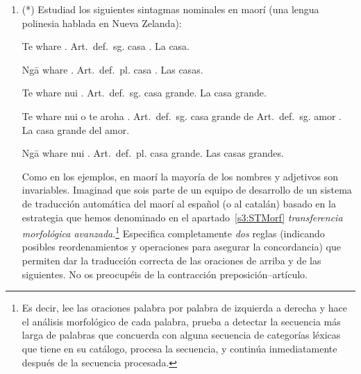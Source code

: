 \begin{enumerate}
\item (*) Estudiad los siguientes sintagmas nominales en maorí (una lengua polinesia hablada en Nueva Zelanda): 

     \begin{example} 
     \gll Te whare .
          \textsf{Art.\ def.\ sg.} casa . 
     \glt La casa. 
     \glend
     \end{example} 

     \begin{example} 
     \gll Ng\={a} whare . 
          \textsf{Art.\ def.\ pl.} casa . 
     \glt Las casas. 
     \glend
     \end{example} 

     \begin{example} 
     \gll Te whare nui . 
          \textsf{Art.\ def.\ sg.} casa grande. 
     \glt La casa grande. 
     \glend
     \end{example} 

     \begin{example} 
     \gll Te whare nui o te aroha . 
          \textsf{Art.\ def.\ sg.} casa grande de \textsf{Art.\ def.\ 
          sg.} amor . 
     \glt La casa grande del amor. 
     \glend
     \end{example} 

     \begin{example} 
     \gll Ng\={a} whare nui . 
          \textsf{Art.\ def.\ pl.} casa grande. 
     \glt Las casas grandes. 
     \glend
     \end{example} 

Como en los ejemplos, en maorí la mayoría de los nombres y adjetivos son invariables. Imaginad que sois parte de un equipo de desarrollo de un sistema de traducción automática del maorí al español (o al catalán) basado en la estrategia que hemos denominado en el apartado~\ref{s3:STMorf} \emph{transferencia morfológica avanzada}.\footnote{Es decir, lee las oraciones palabra por palabra de izquierda a derecha y hace el análisis morfológico de cada palabra, prueba a detectar la secuencia más larga de palabras que concuerda con alguna secuencia de categorías léxicas que tiene en su catálogo, procesa la secuencia, y continúa inmediatamente después de la secuencia procesada.} Especifica completamente \emph{dos} reglas (indicando posibles reordenamientos y operaciones para asegurar la concordancia) que permiten dar la traducción correcta de las oraciones de arriba y de las siguientes. No os preocupéis de la contracción preposición--artículo. 


\end{enumerate}
